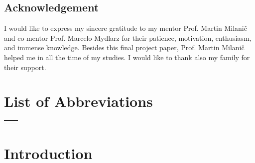 \documentclass[12pt,a4paper,titlepage,openany]{report}
\begin{document}

\newpage
\section*{Acknowledgement}

I would like to express my sincere gratitude to my mentor Prof. Martin Milani\v c and co-mentor Prof. Marcelo Mydlarz for their patience, motivation, enthusiasm, and immense knowledge. Besides this final project paper, Prof. Martin Milani\v c helped me in all the time of my studies.
I would like to thank also my family for their support.

\newpage

\tableofcontents
{}
\newpage
\listoffigures
{}
\newpage

\chapter*{List of Abbreviations}
\thispagestyle{fancyplain}
\begin{longtable}{@{}p{1cm}@{}p{\dimexpr\textwidth-1cm\relax}@{}}
\nomenclature{{\it e.g.}}{for example}
\end{longtable}
\newpage

\normalsize


% 
% 
\chapter{Introduction}
\thispagestyle{fancy}
\end{document}
